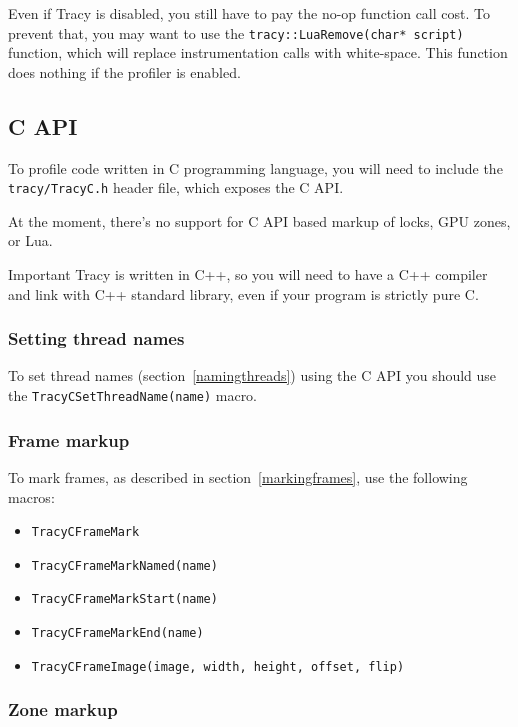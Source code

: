 \documentclass[hidelinks,titlepage,a4paper]{article}
\begin{document}
Even if Tracy is disabled, you still have to pay the no-op function call cost. To prevent that, you may want to use the \texttt{tracy::LuaRemove(char* script)} function, which will replace instrumentation calls with white-space. This function does nothing if the profiler is enabled.

\subsection{C API}
\label{capi}

To profile code written in C programming language, you will need to include the \texttt{tracy/TracyC.h} header file, which exposes the C API.

At the moment, there's no support for C API based markup of locks, GPU zones, or Lua.

\begin{bclogo}[
noborder=true,
couleur=black!5,
logo=\bcbombe
]{Important}
Tracy is written in C++, so you will need to have a C++ compiler and link with C++ standard library, even if your program is strictly pure C.
\end{bclogo}

\subsubsection{Setting thread names}

To set thread names (section~\ref{namingthreads}) using the C API you should use the \texttt{TracyCSetThreadName(name)} macro.

\subsubsection{Frame markup}

To mark frames, as described in section~\ref{markingframes}, use the following macros:

\begin{itemize}
\item \texttt{TracyCFrameMark}
\item \texttt{TracyCFrameMarkNamed(name)}
\item \texttt{TracyCFrameMarkStart(name)}
\item \texttt{TracyCFrameMarkEnd(name)}
\item \texttt{TracyCFrameImage(image, width, height, offset, flip)}
\end{itemize}

\subsubsection{Zone markup}
\label{czonemarkup}
\end{document}
